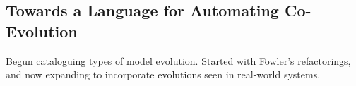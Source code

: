 \subsection{Towards a Language for Automating Co-Evolution}
\label{sub:development}
Begun cataloguing types of model evolution. Started with Fowler's refactorings, and now expanding to incorporate evolutions seen in real-world systems.
